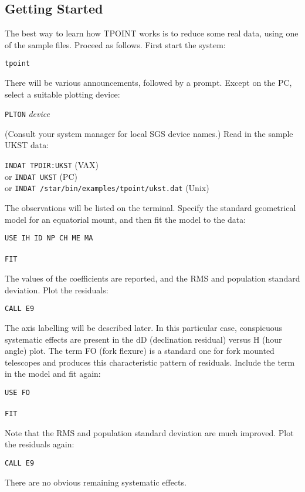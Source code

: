 \subsection{Getting Started}
The best way to learn how TPOINT works is to reduce some
real data, using one of the sample files.  Proceed as follows.
First start the system:
\begin{cmnds}
\> \> {\tt tpoint}
\end{cmnds}
There will be various announcements, followed by a \fstring{*} prompt.
Except on the PC, select a suitable plotting device:
\begin{cmnds}
\> \> {\tt PLTON} {\it device}
\end{cmnds}
(Consult your system manager for local SGS device names.)
Read in the sample UKST data:
\begin{cmnds}
\> \> {\tt INDAT TPDIR:UKST} \> \hspace{10em}(VAX) \\
\> or \> {\tt INDAT UKST} \> \hspace{10em}(PC) \\
\> or \> {\tt INDAT /star/bin/examples/tpoint/ukst.dat} \> \hspace{10em}(Unix)
\end{cmnds}
The observations will be listed on the terminal.  Specify the
standard geometrical model for an equatorial mount, and then
fit the model to the data:
\begin{cmnds}
\> \> {\tt USE IH ID NP CH ME MA} \\ \\
\> \> {\tt FIT}
\end{cmnds}
The values of the coefficients are reported, and the RMS and
population standard deviation.  Plot the residuals:
\begin{cmnds}
\> \> {\tt CALL E9}
\end{cmnds}
The axis labelling will be described later.  In this particular case,
conspicuous systematic effects are present in the dD (declination
residual) versus H (hour angle) plot.
The term FO (fork flexure) is a standard one for fork mounted
telescopes and produces this characteristic
pattern of residuals.  Include the
term in the model and fit again:
\begin{cmnds}
\> \> {\tt USE FO} \\ \\
\> \> {\tt FIT}
\end{cmnds}
Note that the RMS and population standard deviation are much improved.
Plot the residuals again:
\begin{cmnds}
\> \> {\tt CALL E9}
\end{cmnds}
There are no obvious remaining systematic effects.

